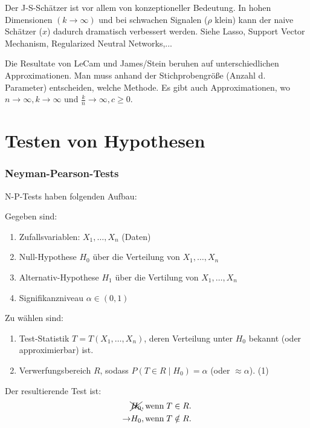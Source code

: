 \documentclass[10pt]{article}
\newcommand{\FZV}{X_1, \ldots, X_n} %
\begin{document}
	\begin{Bemerkung}
		Der J-S-Schätzer ist vor allem von konzeptioneller Bedeutung. In hohen Dimensionen $(k \rightarrow \infty)$ und bei schwachen Signalen ($\rho$ klein) kann der naive Schätzer ($x$) dadurch dramatisch verbessert werden. Siehe Lasso, Support Vector Mechanism, Regularized Neutral Networks,...
		
		Die Resultate von LeCam und James/Stein beruhen auf unterschiedlichen Approximationen. Man muss anhand der Stichprobengröße (Anzahl d. Parameter) entscheiden, welche Methode. Es gibt auch Approximationen, wo $ n \rightarrow \infty, k \rightarrow \infty$ und $\frac{k}{n} \rightarrow \infty, c \geq 0$. 
	\end{Bemerkung}

	
	\pagebreak
	\part{Testen von Hypothesen}
	
	\section{Neyman-Pearson-Tests}
	
	N-P-Tests haben folgenden Aufbau:
	
	Gegeben sind:
	\begin{enumerate}
		\item Zufallsvariablen: $\FZV$ (Daten)
		\item Null-Hypothese $H_0$ über die Verteilung von $\FZV$
		\item Alternativ-Hypothese $H_1$ über die Vertilung von $\FZV$
		\item Signifikanzniveau $\alpha \in (0,1)$
	\end{enumerate}
	Zu wählen sind:
	\begin{enumerate}
		\item Test-Statistik $T = T(\FZV)$, deren Verteilung unter $H_0$ bekannt (oder approximierbar) ist. 
		\item Verwerfungsbereich $R$, sodass $P(T \in R \mid H_0) = \alpha$ (oder $\approx \alpha$). (1)
	\end{enumerate}
	
	Der resultierende Test ist: 
	\begin{equation*}
		\begin{split}
			&\xcancel{H_0}, \text{wenn} \; T \in R.\\
			\rightarrow &H_0, \text{wenn} \; T \notin R.
		\end{split}
	\end{equation*}
	
\end{document}
